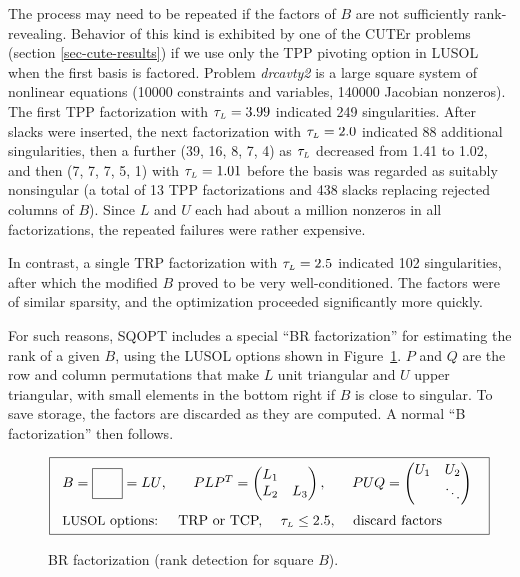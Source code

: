 \documentclass[draft,leqno,onefignum,onetabnum]{siamltex}
\def\Lmax{\hbox{$\tau_{\scriptscriptstyle L}$}}  %
\def\CUTEr {{\small CUTEr}}
\def\LUSOL {{\small LUSOL}}
\def\SQOPT {{\small SQOPT}}
\def\Cute#1{\hbox{\it\lowercase{#1}\/}}
\newcommand{\pmat}[1]{\begin{pmatrix}#1\end{pmatrix}}
\begin{document}
The process may need to be repeated if the factors of $B$
are not sufficiently rank-revealing.
Behavior of this kind is exhibited by
one of the \CUTEr{} problems (section \ref{sec-cute-results})
if we use only the TPP pivoting option in \LUSOL{}
when the first basis is factored.
Problem \Cute{DRCAVTY2} is a large square system of nonlinear equations
(10000 constraints and variables, 140000 Jacobian nonzeros).
The first TPP factorization with $\Lmax = 3.99$
indicated 249 singularities.  After slacks were inserted,
the next factorization with $\Lmax = 2.0$
indicated 88 additional singularities,
then a further (39, 16, 8, 7, 4) as
$\Lmax$ decreased from 1.41 to 1.02,
and then (7, 7, 7, 5, 1) with $\Lmax = 1.01$
before the basis was regarded as suitably nonsingular
(a total of 13 TPP factorizations and 438 slacks replacing
rejected columns of $B$).
Since $L$ and $U$ each had about a million nonzeros
in all factorizations, the repeated failures were rather expensive.

In contrast, a single TRP factorization with $\Lmax = 2.5$
indicated 102 singularities, after which the modified $B$
proved to be very well-conditioned.
The factors were of similar sparsity, and the optimization
proceeded significantly more quickly.

For such reasons, \SQOPT{} includes a special
``BR factorization'' for estimating the rank of a given $B$,
using the \LUSOL{} options shown in Figure~\ref{fig-BR}.
$P$ and $Q$ are the row and column permutations that make $L$
unit triangular and $U$ upper triangular, with small elements
in the bottom right if $B$ is close to singular.
To save storage, the factors are discarded as they are computed.
A normal ``B factorization'' then follows.

\begin{figure}[t]
 $$
 \fbox{\begin{tabular}{l@{\qquad}l@{\qquad}l}
       $B = \raisebox{-5pt}{\fbox{\phantom{\rule{15pt}{15pt}}}} = LU$,
                    & $ PLP^T = \pmat{L_1 \\ L_2 & L_3}, $
                    & $ PUQ   = \pmat{U_1 & U_2 \\ & \ddots} $
       \\[15pt]
         \rlap{\LUSOL{} options: \quad TRP or TCP,
                                \quad $\Lmax \le 2.5$,
                                \quad discard factors}
       \end{tabular}
      }
 $$
 \caption{BR factorization (rank detection for square $B$).}
 \label{fig-BR}
\end{figure}
\end{document}
